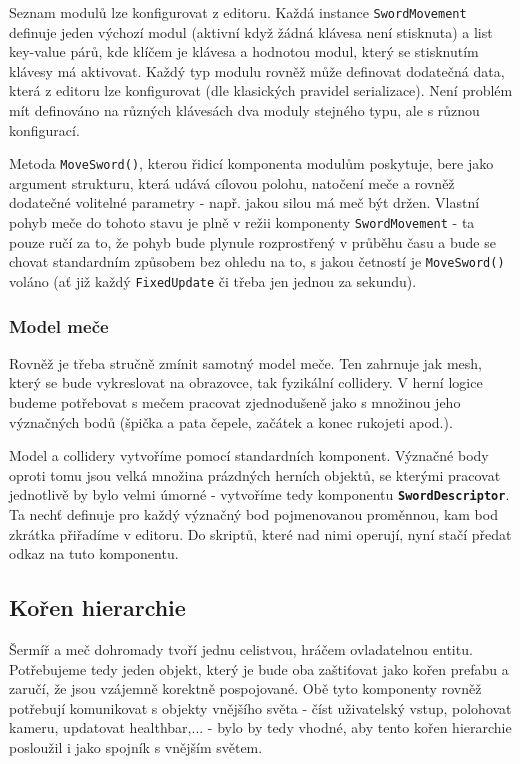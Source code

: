 Seznam modulů lze konfigurovat z editoru. Každá instance \texttt{SwordMovement} definuje jeden výchozí modul (aktivní když žádná klávesa není stisknuta) a list key-value párů, kde klíčem je klávesa a hodnotou modul, který se stisknutím klávesy má aktivovat. Každý typ modulu rovněž může definovat dodatečná data, která z editoru lze konfigurovat (dle klasických pravidel serializace). Není problém mít definováno na různých klávesách dva moduly stejného typu, ale s různou konfigurací.

Metoda \texttt{MoveSword()}, kterou řidicí komponenta modulům poskytuje, bere jako argument strukturu, která udává cílovou polohu, natočení meče a rovněž dodatečné volitelné parametry - např. jakou silou má meč být držen. Vlastní pohyb meče do tohoto stavu je plně v režii komponenty \texttt{SwordMovement} - ta pouze ručí za to, že pohyb bude plynule rozprostřený v průběhu času a bude se chovat standardním způsobem bez ohledu na to, s jakou četností je \texttt{MoveSword()} voláno (ať již každý \texttt{FixedUpdate} či třeba jen jednou za sekundu).

\subsubsection*{Model meče} \label{interfacesSwordModelSubsubsection}

Rovněž je třeba stručně zmínit samotný model meče. Ten zahrnuje jak mesh, který se bude vykreslovat na obrazovce, tak fyzikální collidery. V herní logice budeme potřebovat s mečem pracovat zjednodušeně jako s množinou jeho význačných bodů (špička a pata čepele, začátek a konec rukojeti apod.).

Model a collidery vytvoříme pomocí standardních komponent. Význačné body oproti tomu jsou velká množina prázdných herních objektů, se kterými pracovat jednotlivě by bylo velmi úmorné - vytvoříme tedy komponentu \textbf{\texttt{SwordDescriptor}}. Ta nechť definuje pro každý význačný bod pojmenovanou proměnnou, kam bod zkrátka přiřadíme v editoru. Do skriptů, které nad nimi operují, nyní stačí předat odkaz na tuto komponentu.


\subsection{Kořen hierarchie} 

Šermíř a meč dohromady tvoří jednu celistvou, hráčem ovladatelnou entitu. Potřebujeme tedy jeden objekt, který je bude oba zaštiťovat jako kořen prefabu a zaručí, že jsou vzájemně korektně pospojované. Obě tyto komponenty rovněž potřebují komunikovat s objekty vnějšího světa - číst uživatelský vstup, polohovat kameru, updatovat healthbar,... - bylo by tedy vhodné, aby tento kořen hierarchie posloužil i jako spojník s vnějším světem. 

